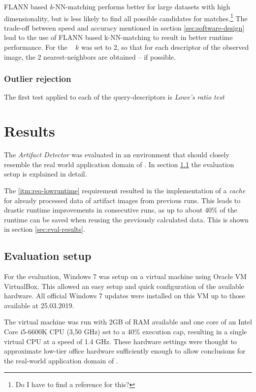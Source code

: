 FLANN based \emph{k}-NN-matching performs better for large datasets with high dimensionality, but is less likely to find all possible candidates for matches.\footnote{Do I have to find a reference for this?} The trade-off between speed and accuracy mentioned in section \ref{sec:software-design} lead to the use of FLANN based k-NN-matching to result in better runtime performance. For the \vd~ $k$ was set to $2$, so that for each descriptor of the observed image, the $2$ nearest-neighbors are obtained -- if possible.

\subsection{Outlier rejection}\label{sec:tech-bg:subsec:outlier-rejection}

The first test applied to each of the query-descriptors is \emph{Lowe's ratio test} \cite{lowes_ratio}

\chapter{Results}\label{ch:results}

The \emph{Artifact Detector} was evaluated in an environment that should closely resemble the real world application domain of \ape. In section \ref{sec:eval-env} the evaluation setup is explained in detail.

The \ref{itm:req-lowruntime} requirement resulted in the implementation of a \emph{cache} for already processed data of artifact images from previous runs. This leads to drastic runtime improvements in consecutive runs, as up to about 40\% of the runtime can be saved when reusing the previously calculated data. This is shown in section \ref{sec:eval-results}.


\section{Evaluation setup}\label{sec:eval-env}

For the evaluation, Windows 7 was setup on a virtual machine using Oracle VM VirtualBox\cite{virtualbox}. This allowed an easy setup and quick configuration of the available hardware. All official Windows 7 updates were installed on this VM up to those available at 25.03.2019.

The virtual machine was run with 2GB of RAM available and one core of an Intel Core i5-6600K CPU (3,50 GHz) set to a 40\% execution cap, resulting in a single virtual CPU at a speed of 1.4 GHz. These hardware settings were thought to approximate low-tier office hardware sufficiently enough to allow conclusions for the real-world application domain of \ape.

